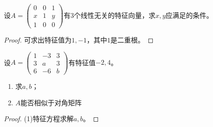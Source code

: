 \begin{theorem}
	设$A=
	\begin{pmatrix}
		0 & 0 & 1 \\
		x & 1 & y \\
		1 & 0 & 0 
	\end{pmatrix}$有$3$个线性无关的特征向量，求$x,y$应满足的条件。
\end{theorem}
\begin{proof}
	可求出特征值为$1,-1$，其中$1$是二重根。
\end{proof}

\begin{theorem}
	设$A=
	\begin{pmatrix}
		1 & -3 & 3 \\
		3 & a & 3 \\
		6 & -6 & b
	\end{pmatrix}$有特征值$-2,4$。
	\begin{enumerate}
		\item 求$a,b$；
		\item $A$能否相似于对角矩阵
	\end{enumerate}
\end{theorem}
\begin{proof}
	(1)特征方程求解$a,b$。
\end{proof}

